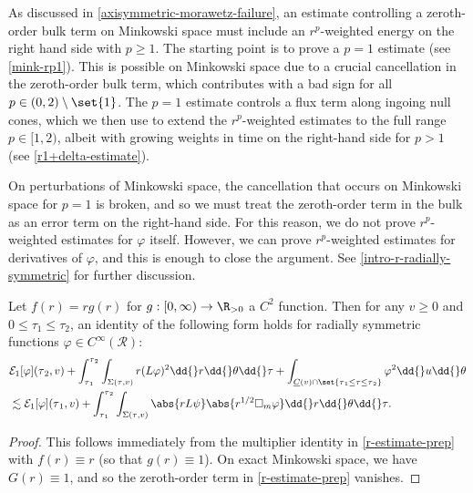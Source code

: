 \documentclass[10pt, reqno]{amsart}
\begin{document}
As discussed in \cref{axisymmetric-morawetz-failure}, an estimate controlling a
zeroth-order bulk term on Minkowski space must include an \(r^p\)-weighted
energy on the right hand side with \(p\ge 1\). The starting point is to prove a
\(p = 1\) estimate (see \cref{mink-rp1}). This is possible on Minkowski space due
to a crucial cancellation in the zeroth-order bulk term, which contributes with
a bad sign for all \(p\in (0,2)\setminus \set{1}\). The \(p=1\) estimate
controls a flux term along ingoing null cones, which we then use to extend the
\(r^p\)-weighted estimates to the full range \(p\in [1,2)\), albeit with growing
weights in time on the right-hand side for \(p > 1\) (see
\cref{r1+delta-estimate}).

On perturbations of Minkowski space, the cancellation that occurs on Minkowski
space for \(p = 1\) is broken, and so we must treat the zeroth-order term in the
bulk as an error term on the right-hand side. For this reason, we do not prove
\(r^p\)-weighted estimates for \(\varphi{}\) itself. However, we can prove
\(r^p\)-weighted estimates for derivatives of \(\varphi{}\), and this is enough
to close the argument. See \cref{intro-r-radially-symmetric} for further
discussion.
\begin{proposition}[\(r^p\)-weighted energy estimate for \(p=1\) on Minkowski space]
Let \(f(r) = rg(r)\) for \(g : [0,\infty)\to \R_{>0}\) a \(C^2\) function. Then for any
\(v\ge 0\) and \(0\le \tau_1\le \tau_2\), an identity of the following form
holds for radially symmetric functions \(\varphi{}\in C^\infty(\mathcal{R})\):
\begin{equation}\label{mink-rp1-equation}
\begin{split}
&\mathcal{E}_1[\varphi{}](\tau{}_2,v) + \int_{\tau{}_1}^{\tau{}_2} \int _{\Sigma{}(\tau{},v)} r(L\varphi{})^2\dd{}r\dd{}\theta{}\dd{}\tau{}  + \int _{\underline{C}(v)\cap \set{\tau{}_1\le \tau{}\le \tau{}_2}} \varphi^2 \dd{}u\dd{}\theta{} \\
&\lesssim \mathcal{E}_1[\varphi{}](\tau{}_1,v) + \int_{\tau{}_1}^{\tau{}_2}\int _{\Sigma{}(\tau{},v)} \abs{rL\psi{}}\abs{r^{1/2}\Box{}_m\varphi{}}\dd{}r\dd{}\theta{}\dd{}\tau{}.
\end{split}
\end{equation}
\label{mink-rp1}
\end{proposition}
\begin{proof}
This follows immediately from the multiplier identity in \cref{r-estimate-prep}
with \(f(r)\equiv r\) (so that \(g(r)\equiv 1\)). On exact Minkowski space, we
have \(G(r) \equiv 1\), and so the zeroth-order term in \cref{r-estimate-prep}
vanishes.
\end{proof}
\end{document}
